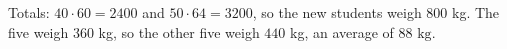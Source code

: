 Totals: $40\cdot60=2400$ and $50\cdot64=3200$, so the new students weigh $800$ kg. The five weigh $360$ kg, so the other five weigh $440$ kg, an average of $\boxed{88\text{ kg}}$.
